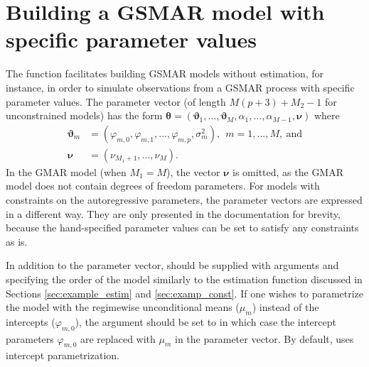 \documentclass[nojss]{jss} %
\begin{document}
\section{Building a GSMAR model with specific parameter values}\label{sec:GSMAR}
The function  facilitates building GSMAR models without estimation, for instance, in order to simulate observations from a GSMAR process with specific parameter values. The parameter vector (of length $M(p+3)+M_2-1$ for unconstrained models) has the form $\boldsymbol{\theta} = (\boldsymbol{\vartheta}_1,...,\boldsymbol{\vartheta}_M,\alpha_1,...,\alpha_{M-1},\boldsymbol{\nu})$ where
\begin{align}
\boldsymbol{\vartheta}_m &= (\varphi_{m,0},\varphi_{m,1},...,\varphi_{m,p},\sigma^2_m),\ \ m=1,...,M, \ \text{and}  \\
\boldsymbol{\nu} &= (\nu_{M_1+1},...,\nu_M).
\end{align}
In the GMAR model (when $M_1=M$), the vector $\boldsymbol{\nu}$ is omitted, as the GMAR model does not contain degrees of freedom parameters. For models with constraints on the autoregressive parameters, the parameter vectors are expressed in a different way. They are only presented in the documentation for brevity, because the hand-specified parameter values can be set to satisfy any constraints as is.


In addition to the parameter vector,  should be supplied with arguments  and  specifying the order of the model similarly to the estimation function  discussed in Sections \ref{sec:example_estim} and \ref{sec:examp_const}. If one wishes to parametrize the model with the regimewise unconditional means ($\mu_m$) instead of the intercepts ($\varphi_{m,0}$), the argument  should be set to  in which case the intercept parameters $\varphi_{m,0}$ are replaced with $\mu_m$ in the parameter vector. By default,  uses intercept parametrization.
\end{document}
